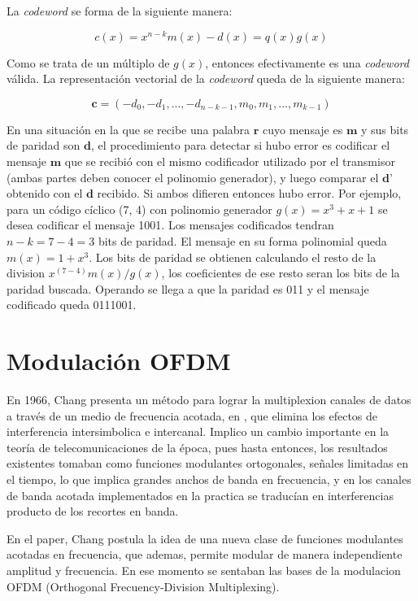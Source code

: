 La \textit{codeword} se forma de la siguiente manera:

\begin{equation}
c(x) = x^{n-k}m(x)-d(x) = q(x)g(x)
\end{equation}

Como se trata de un múltiplo de $g(x)$, entonces efectivamente es una \textit{codeword} válida. La representación vectorial de la \textit{codeword} queda de la siguiente manera:

\begin{equation}
\textbf{c} = (-d_0, -d_1, ..., -d_{n-k-1}, m_0, m_1, ..., m_{k-1})
\end{equation}

En una situación en la que se recibe una palabra $\textbf{r}$ cuyo mensaje es $\textbf{m}$  y sus bits de paridad son $\textbf{d}$, el procedimiento para detectar si hubo error es codificar el mensaje $\textbf{m}$ que se recibió con el mismo codificador utilizado por el transmisor (ambas partes deben conocer el polinomio generador), y luego comparar el $\textbf{d'}$ obtenido con el $\textbf{d}$ recibido. Si ambos difieren entonces hubo error. 
Por ejemplo, para un código cíclico (7, 4) con polinomio generador $g(x) = x^3 + x + 1$ se desea codificar el mensaje 1001. Los mensajes codificados tendran $n-k = 7 - 4 = 3$ bits de paridad. El mensaje en su forma polinomial queda $m(x) = 1 + x^3$.
Los bits de paridad se obtienen calculando el resto de la division $x^{(7-4)}m(x)/g(x)$, los coeficientes de ese resto seran los bits de la paridad buscada. Operando se llega a que la paridad es 011 y el mensaje codificado queda 0111001.

\section{Modulación OFDM}

En 1966, Chang presenta un método para lograr la multiplexion canales de datos a través de un medio de frecuencia acotada, en \cite{chang-ofdm}, que elimina los efectos de interferencia intersimbolica e intercanal. Implico un cambio importante en la teoría de telecomunicaciones de la época, pues hasta entonces, los resultados existentes tomaban como funciones modulantes ortogonales, señales limitadas en el tiempo, lo que implica grandes anchos de banda en frecuencia, y en los canales de banda acotada implementados en la practica se traducían en interferencias producto de los recortes en banda. 

En el paper, Chang postula la idea de una nueva clase de funciones modulantes acotadas en frecuencia, que ademas, permite modular de manera independiente amplitud y frecuencia. En ese momento se sentaban las bases de la modulacion OFDM (Orthogonal Frecuency-Division Multiplexing).


